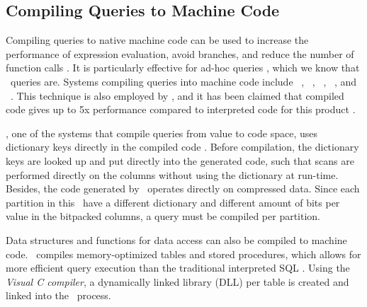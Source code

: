 \subsection{Compiling Queries to Machine Code}
\label{sub:Compiling Queries to Machine Code}
Compiling queries to native machine code can be used to increase the performance of expression evaluation, avoid branches, and reduce the number of function calls \cite{Lamb2012-kg, Neumann2011-uq}. It is particularly effective for ad-hoc queries \cite{Psaroudakis2014-ma}, which we know that \bd~queries are. Systems compiling queries into machine code include \blink~\cite{Barber2012-xt}, \ibm~\cite{Raman2013-em}, \vertica~\cite{Lamb2012-kg}, \hyper~\cite{Psaroudakis2014-ma}, and \mssql~\cite{Delaney2014-ip}. This technique is also employed by \qlikview, and it has been claimed that compiled code gives up to 5x performance compared to interpreted code for this product \cite{noauthor_undated-js}.

\blink, one of the systems that compile queries from value to code space, uses dictionary keys directly in the compiled code \cite{Barber2012-xt}. Before compilation, the dictionary keys are looked up and put directly into the generated code, such that scans are performed directly on the columns without using the dictionary at run-time. Besides, the code generated by \blink~operates directly on compressed data. Since each partition in this \blink~have a different dictionary and different amount of bits per value in the bitpacked columns, a query must be compiled per partition. 

Data structures and functions for data access can also be compiled to machine code. \mssql~compiles memory-optimized tables and stored procedures, which allows for more efficient query execution than the traditional interpreted SQL \cite{Delaney2014-ip}. Using the \textit{Visual C compiler}, a dynamically linked library (DLL) per table is created and linked into the \mssql~process.

